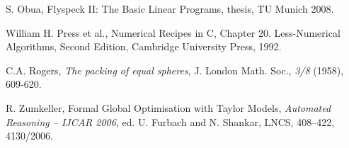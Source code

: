 \documentclass{llncs}
\begin{document}
\begin{thebibliography}{HeHa94}
  S. Obua, Flyspeck II: The Basic Linear Programs,
thesis, TU Munich 2008.

 William H. Press et al., Numerical Recipes in C,
Chapter 20. Less-Numerical Algorithms, Second Edition, Cambridge
University Press, 1992.

 C.A. Rogers, {\it The packing of equal spheres},
J. London Math. Soc., \emph{3/8} (1958), 609-620.

  R. Zumkeller,  Formal Global Optimisation with
 Taylor Models, {\it Automated Reasoning -- IJCAR 2006},
 ed. U. Furbach and N. Shankar, LNCS, 408--422, 4130/2006.


\end{thebibliography}
\end{document}
